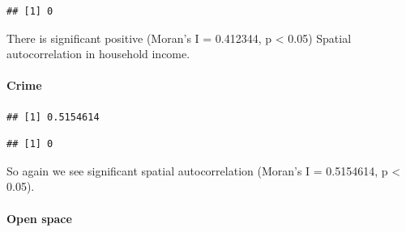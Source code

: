 \documentclass[
]{article}
\newenvironment{Shaded}{\begin{snugshade}}{\end{snugshade}}
\newcommand{\ControlFlowTok}[1]{\textcolor[rgb]{0.13,0.29,0.53}{\textbf{#1}}}
\newcommand{\DecValTok}[1]{\textcolor[rgb]{0.00,0.00,0.81}{#1}}
\newcommand{\DocumentationTok}[1]{\textcolor[rgb]{0.56,0.35,0.01}{\textbf{\textit{#1}}}}
\newcommand{\FunctionTok}[1]{\textcolor[rgb]{0.00,0.00,0.00}{#1}}
\newcommand{\NormalTok}[1]{#1}
\newcommand{\OtherTok}[1]{\textcolor[rgb]{0.56,0.35,0.01}{#1}}
\newcommand{\SpecialCharTok}[1]{\textcolor[rgb]{0.00,0.00,0.00}{#1}}
\newcommand{\StringTok}[1]{\textcolor[rgb]{0.31,0.60,0.02}{#1}}
\begin{document}
\begin{verbatim}
## [1] 0
\end{verbatim}

There is significant positive (Moran's I = 0.412344, p \textless{} 0.05)
Spatial autocorrelation in household income.

\hypertarget{crime}{%
\paragraph{Crime}\label{crime}}

\begin{Shaded}
\end{Shaded}

\begin{verbatim}
## [1] 0.5154614
\end{verbatim}

\begin{Shaded}
\end{Shaded}

\begin{verbatim}
## [1] 0
\end{verbatim}

So again we see significant spatial autocorrelation (Moran's I =
0.5154614, p \textless{} 0.05).

\hypertarget{open-space}{%
\paragraph{Open space}\label{open-space}}
\end{document}
